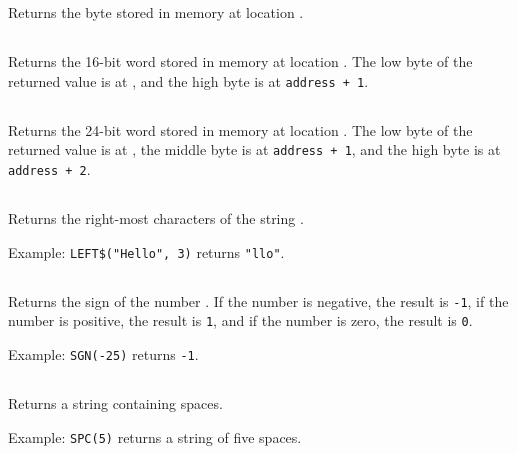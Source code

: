 \documentclass{article}
\begin{document}
    Returns the byte stored in memory at location .

    \subsection{}

    Returns the 16-bit word stored in memory at location .
    The low byte of the returned value is at , and the
    high byte is at \verb-address + 1-.

    \subsection{}

    Returns the 24-bit word stored in memory at location .
    The low byte of the returned value is at ,
    the middle byte is at \verb-address + 1-, 
    and the high byte is at \verb-address + 2-.

    \subsection{}

    Returns the right-most  characters of the string .

    Example: \verb+LEFT$("Hello", 3)+ returns \verb+"llo"+.
    
    \subsection{}

    Returns the sign of the number .
    If the number is negative, the result is \verb+-1+,
    if the number is positive, the result is \verb+1+,
    and if the number is zero, the result is \verb+0+.

    Example: \verb+SGN(-25)+ returns \verb+-1+.

    \subsection{}

    Returns a string containing  spaces.
    
    Example: \verb+SPC(5)+ returns a string of five spaces.
\end{document}
